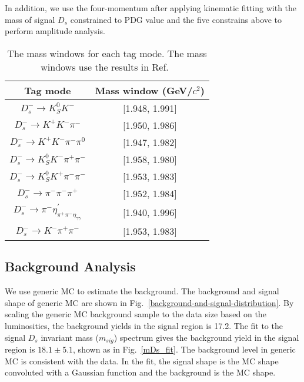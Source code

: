 {In addition, we use the four-momentum after applying kinematic fitting with the mass of signal $D_{s}$ constrained to PDG value and the five constrains above to perform amplitude analysis.

\begin{table}[htbp]
    \caption{ The mass windows for each tag mode. The mass windows use the results in Ref.~\cite{Doc-DB-630-v35} }
    \label{ST-mass-window}
    \begin{center}
        \begin{tabular}{cc}
            \toprule\toprule
            Tag mode & Mass window (GeV/$c^{2}$)  \\
            \hline
            $D_{s}^{-} \rightarrow K_{S}^{0}K^{-}$                          & [1.948, 1.991]    \\
            $D_{s}^{-} \rightarrow K^{+}K^{-}\pi^{-}$                       & [1.950, 1.986]    \\
            $D_{s}^{-} \rightarrow K^{+}K^{-}\pi^{-}\pi^{0}$                & [1.947, 1.982]    \\
            $D_{s}^{-} \rightarrow K_{S}^{0}K^{-}\pi^{+}\pi^{-}$            & [1.958, 1.980]    \\
            $D_{s}^{-} \rightarrow K_{S}^{0}K^{+}\pi^{-}\pi^{-}$            & [1.953, 1.983]    \\
            $D_{s}^{-} \rightarrow \pi^{-}\pi^{-}\pi^{+}$                   & [1.952, 1.984]    \\
            $D_{s}^{-} \rightarrow \pi^{-}\eta_{\pi^{+}\pi^{-}\eta_{\gamma\gamma}}^{'}$  & [1.940, 1.996]        \\
            $D_{s}^{-} \rightarrow K^{-}\pi^{+}\pi^{-}$                     & [1.953, 1.983]    \\
            \bottomrule\bottomrule
        \end{tabular}
    \end{center}
\end{table}

}

\subsection{Background Analysis}
We use generic MC to estimate the background. The background and signal shape of generic MC are shown in Fig.~\ref{background-and-signal-distribution}. 
By scaling the generic MC background sample to the data size based on the luminosities, the background yields in the signal region is 17.2. 
The fit to the signal $D_{s}$ invariant mass ($m_{sig}$) spectrum gives the background yield in the signal region is $18.1 \pm 5.1$, shown as in Fig.~\ref{mDs_fit}.  
The background level in generic MC is consistent with the data. In the fit, the signal shape is the MC shape convoluted with a Gaussian function and the background is the MC shape. 

